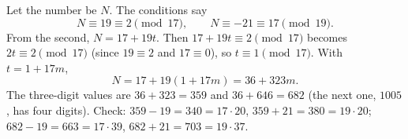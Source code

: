 Let the number be $N$. The conditions say
\[
N\equiv19\equiv2\pmod{17},\qquad N\equiv-21\equiv17\pmod{19}.
\]
From the second, $N=17+19t$. Then $17+19t\equiv2\pmod{17}$ becomes $2t\equiv2\pmod{17}$ (since $19\equiv2$ and $17\equiv0$), so $t\equiv1\pmod{17}$. With $t=1+17m$,
\[
N=17+19(1+17m)=36+323m .
\]
The three-digit values are $36+323=\boxed{359}$ and $36+646=\boxed{682}$ (the next one, $1005$, has four digits). Check: $359-19=340=17\cdot20$, $359+21=380=19\cdot20$; $682-19=663=17\cdot39$, $682+21=703=19\cdot37$.
